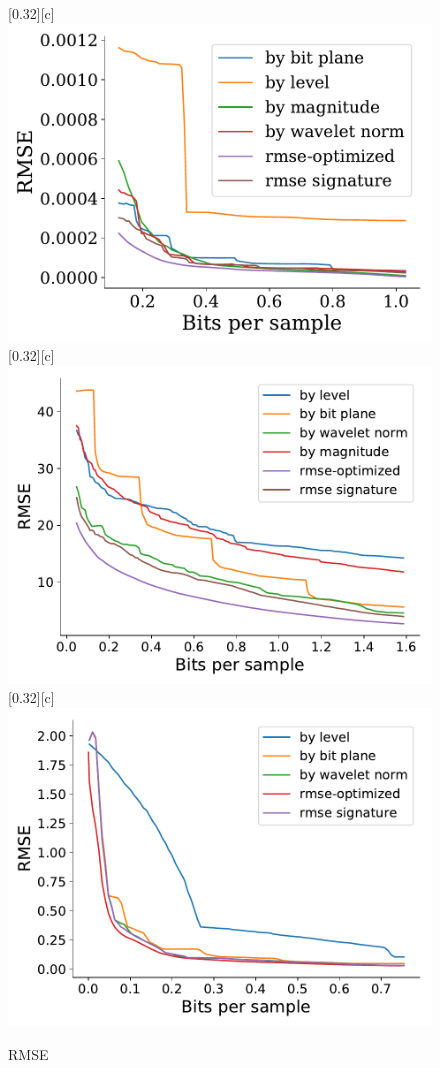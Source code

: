 \documentclass{article}
\begin{document}
\begin{figure}[htb]
        [0.32\linewidth][c]{%
                \includegraphics[width=0.3\linewidth]{img/supplementary/rmse-optimized-karfs}}
        [0.32\linewidth][c]{%
                \includegraphics[width=0.3\linewidth]{img/supplementary/rmse-optimized-aneurism}}
        [0.32\linewidth][c]{%
                \includegraphics[width=0.3\linewidth]{img/supplementary/rmse-optimized-velocityz}}
        \caption{RMSE}
\end{figure}
\end{document}
